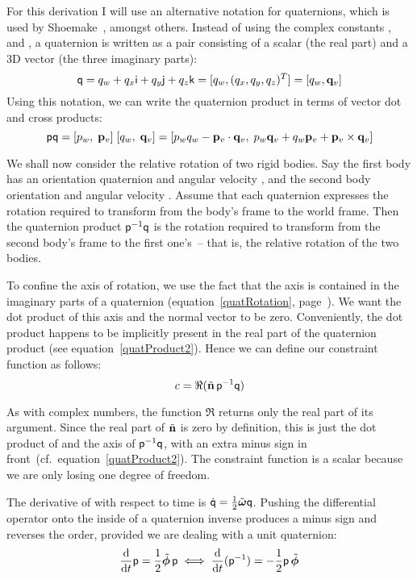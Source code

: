 For this derivation I will use an alternative notation for quaternions, which is used by
Shoemake~\cite{Shoemake:85}, amongst others. Instead of using the complex constants \qi{}, \qj{}
and \qk{}, a quaternion is written as a pair consisting of a scalar (the real part) and a 3D
vector (the three imaginary parts):
\begin{equation}
\q{q} = q_w + q_x\qi + q_y\qj + q_z\qk = [q_w, (q_x, q_y, q_z)^T] = [q_w, \ve{q}_v]
\end{equation}
Using this notation, we can write the quaternion product in terms of vector dot and cross products:
\begin{equation}\label{quatProduct2}
\q{p}\q{q} = [p_w,\; \ve{p}_v]\;[q_w,\; \ve{q}_v] =
    [p_w q_w - \ve{p}_v \cdot \ve{q}_v,\;
    p_w \ve{q}_v + q_w \ve{p}_v + \ve{p}_v \times \ve{q}_v]
\end{equation}

We shall now consider the relative rotation of two rigid bodies. Say the first body has an
orientation quaternion  and angular velocity \ve{\phi}, and the second body orientation
 and angular velocity \ve{\omega}. Assume that each quaternion expresses the rotation
required to transform from the body's frame to the world frame. Then the quaternion product
$\mathsf{p}^{-1}\mathsf{q}$ is the rotation required to transform from the second body's frame to the first
one's~-- that is, the relative rotation of the two bodies.

To confine the axis of rotation, we use the fact that the axis is contained in the imaginary
parts of a quaternion (equation~\ref{quatRotation}, page~\pageref{quatRotation}). We want the dot
product of this axis and the normal vector  to be zero. Conveniently, the dot product
happens to be implicitly present in the real part of the quaternion product
(see equation~\ref{quatProduct2}). Hence we can define our constraint
function as follows:
\begin{equation}\label{rotConstrEqn}
c = \Re(\tilde{\ve{n}}\, \q{p}^{-1}\q{q})
\end{equation}

As with complex numbers, the function $\Re$ returns only the real part of its argument.
Since the real part of $\tilde{\ve{n}}$ is zero by definition, this is just the dot product of
 and the axis of $\mathsf{p}^{-1}\mathsf{q}$, with an extra minus sign in
front~(cf.\ equation~\ref{quatProduct2}). The constraint function is a scalar because
we are only losing one degree of freedom.

The derivative of  with respect to time is
$\dot{\q{q}} = \frac{1}{2}\tilde{\ve{\omega}}\q{q}$. Pushing the differential operator
onto the inside of a quaternion inverse produces a minus sign and reverses the order, provided
we are dealing with a unit quaternion:
\begin{equation}
\frac{\diff}{\diff t} \q{p} = \frac{1}{2}\tilde{\ve{\phi}}\,\q{p} \iff
    \frac{\diff}{\diff t} (\q{p}^{-1}) = -\frac{1}{2}\q{p}\,\tilde{\ve{\phi}}
\end{equation}

